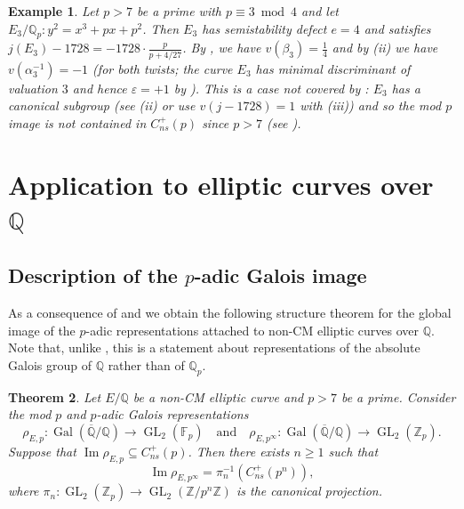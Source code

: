 \documentclass{amsart}
\newcommand{\op}[1]{\operatorname{#1}}
\newcommand{\Qp}{\mathbb{Q}_p}
\newtheorem{theorem}{Theorem}
\newtheorem{example}[theorem]{Example}
\theoremstyle{definition}
\newcommand{\Z}{\mathbb{Z}}
\newcommand{\Q}{\mathbb{Q}}
\newcommand{\F}{\mathbb{F}}
\newcommand{\GL}{\operatorname{GL}}
\numberwithin{theorem}{section}
\numberwithin{equation}{section}
\begin{document}
\begin{example}\label{ex: ambiguous alpha 2}
Let $p>7$ be a prime with $p \equiv 3 \bmod{4}$ and let $E_3/\Q_p: y^2=x^3+px+p^2$. Then $E_3$ has semistability defect $e=4$ and satisfies $j(E_3)-1728 = -1728 \cdot \frac{p}{p + 4/27}$.
By , we have $v(\beta_3)=\frac{1}{4}$ and by (ii) we have $v(\alpha_3^{-1})=-1$ (for both twists; the curve $E_3$ has minimal discriminant of valuation $3$ and hence $\varepsilon=+1$ by ). This is a case not covered by : $E_3$ has a canonical subgroup (see (ii) or use $v(j-1728)=1$ with (iii)) and so the mod $p$ image is not contained in $C_{ns}^+(p)$ since $p>7$ (see ).
\end{example}


\section{Application to elliptic curves over $\Q$}\label{sect: adelic index}

\subsection{Description of the $p$-adic Galois image}\label{subsec: global description p adic image}

As a consequence of  and \cite[Theorem 1.6]{furio24} we obtain the following structure theorem for the global image of the $p$-adic representations attached to non-CM elliptic curves over $\Q$. Note that, unlike , this is a statement about representations of the absolute Galois group of $\mathbb{Q}$ rather than of $\Qp$.

\begin{theorem}\label{thm: no sharp groups over Q}
    Let $E/\Q$ be a non-CM elliptic curve and $p > 7$ be a prime. Consider the mod $p$ and $p$-adic Galois representations
\[
\rho_{E, p} : \op{Gal}(\overline{\Q}/\Q) \to \GL_2(\F_p) \quad \text{and} \quad \rho_{E, p^\infty} : \op{Gal}(\overline{\Q}/\Q) \to \GL_2(\Z_p).
\] 
    Suppose that $\op{Im} \rho_{E, p} \subseteq C_{ns}^+(p)$. Then there exists $n \geq 1$ such that 
    \[
    \op{Im} \rho_{E, p^\infty} = \pi_n^{-1} \left(C_{ns}^+(p^n)\right),
    \]
where $\pi_n : \GL_2(\Z_p) \to \GL_2(\Z/p^n\Z)$ is the canonical projection.
\end{theorem}
\end{document}
